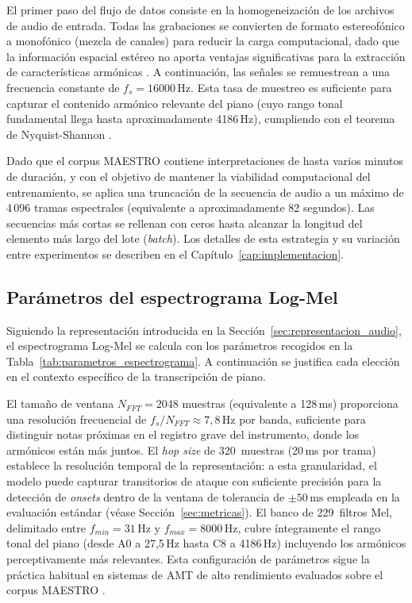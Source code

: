 El primer paso del flujo de datos consiste en la homogeneización de los
archivos de audio de entrada. Todas las grabaciones se convierten de
formato estereofónico a monofónico (mezcla de canales) para reducir la
carga computacional, dado que la información espacial estéreo no aporta
ventajas significativas para la extracción de características armónicas
\cite{muller2021fundamentals}. A continuación, las señales se remuestrean
a una frecuencia constante de $f_s = 16000\,\mathrm{Hz}$. Esta tasa de
muestreo es suficiente para capturar el contenido armónico relevante del
piano (cuyo rango tonal fundamental llega hasta aproximadamente
4186\,Hz), cumpliendo con el teorema de Nyquist-Shannon
\cite{shannon1949communication}.

Dado que el corpus MAESTRO contiene interpretaciones de hasta varios
minutos de duración, y con el objetivo de mantener la viabilidad
computacional del entrenamiento, se aplica una truncación de la
secuencia de audio a un máximo de 4\,096 tramas espectrales
(equivalente a aproximadamente 82 segundos). Las secuencias más
cortas se rellenan con ceros hasta alcanzar la longitud del elemento
más largo del lote (\textit{batch}). Los detalles de esta estrategia
y su variación entre experimentos se describen en el
Capítulo~\ref{cap:implementacion}.

\subsection{Parámetros del espectrograma Log-Mel}

Siguiendo la representación introducida en la
Sección~\ref{sec:representacion_audio}, el espectrograma Log-Mel se
calcula con los parámetros recogidos en la
Tabla~\ref{tab:parametros_espectrograma}. A continuación se justifica
cada elección en el contexto específico de la transcripción de piano.

El tamaño de ventana $N_{FFT} = 2048$ muestras (equivalente a 128\,ms)
proporciona una resolución frecuencial de
$f_s / N_{FFT} \approx 7{,}8\,\mathrm{Hz}$ por banda, suficiente para
distinguir notas próximas en el registro grave del instrumento, donde los
armónicos están más juntos. El \textit{hop size} de 320~muestras
(20\,ms por trama) establece la resolución temporal de la representación:
a esta granularidad, el modelo puede capturar transitorios de ataque con
suficiente precisión para la detección de \textit{onsets} dentro de la
ventana de tolerancia de $\pm 50\,\mathrm{ms}$ empleada en la evaluación
estándar (véase Sección~\ref{sec:metricas}). El banco de 229~filtros Mel,
delimitado entre $f_{min} = 31\,\mathrm{Hz}$ y
$f_{max} = 8000\,\mathrm{Hz}$, cubre íntegramente el rango tonal del
piano (desde A0 a 27{,}5\,Hz hasta C8 a 4186\,Hz) incluyendo los
armónicos perceptivamente más relevantes. Esta configuración de
parámetros sigue la práctica habitual en sistemas de AMT de alto
rendimiento evaluados sobre el corpus MAESTRO
\cite{kong2021high, purwins2019deep}.

